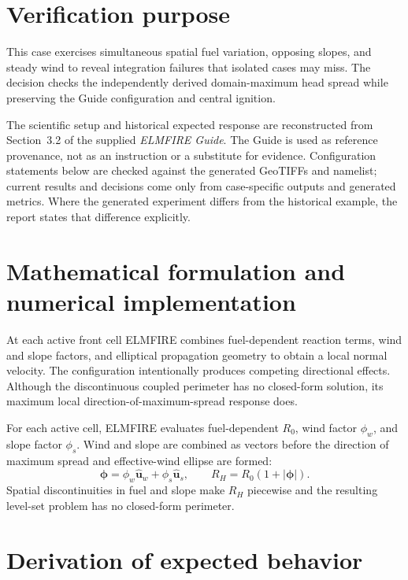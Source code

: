 \section{Verification purpose}

This case exercises simultaneous spatial fuel variation, opposing slopes, and steady wind to reveal integration failures that isolated cases may miss. The decision checks the independently derived domain-maximum head spread while preserving the Guide configuration and central ignition.

The scientific setup and historical expected response are reconstructed from Section~3.2 of the supplied \emph{ELMFIRE Guide}. The Guide is used as reference provenance, not as an instruction or a substitute for evidence. Configuration statements below are checked against the generated GeoTIFFs and namelist; current results and decisions come only from case-specific outputs and generated metrics. Where the generated experiment differs from the historical example, the report states that difference explicitly.

\section{Mathematical formulation and numerical implementation}

At each active front cell ELMFIRE combines fuel-dependent reaction terms, wind and slope factors, and elliptical propagation geometry to obtain a local normal velocity. The configuration intentionally produces competing directional effects. Although the discontinuous coupled perimeter has no closed-form solution, its maximum local direction-of-maximum-spread response does.

For each active cell, ELMFIRE evaluates fuel-dependent \(R_0\), wind factor \(\phi_w\), and slope factor \(\phi_s\). Wind and slope are combined as vectors before the direction of maximum spread and effective-wind ellipse are formed:
\begin{equation}
\boldsymbol{\phi}=\phi_w\widehat{\boldsymbol{u}}_w+\phi_s\widehat{\boldsymbol{u}}_s, \qquad R_H=R_0(1+|\boldsymbol{\phi}|).
\end{equation}
Spatial discontinuities in fuel and slope make \(R_H\) piecewise and the resulting level-set problem has no closed-form perimeter.

\section{Derivation of expected behavior}


